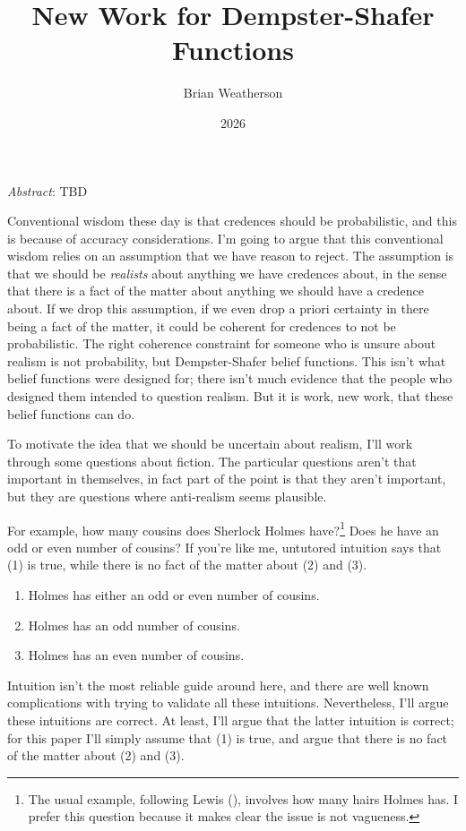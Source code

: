 \documentclass[
  11pt,
  letterpaper,
  DIV=11,
  numbers=noendperiod,
  twoside]{scrartcl}
\title{New Work for Dempster-Shafer Functions}
\author{Brian Weatherson}
\date{2026}
\providecommand{\tightlist}{%
  \setlength{\itemsep}{0pt}\setlength{\parskip}{0pt}}
\renewenvironment{abstract}
 {\vspace{-1.25cm}
 \quotation\small\noindent\emph{Abstract}:}
 {\endquotation}
\renewenvironment{abstract}
 {\quotation\small\noindent\emph{Abstract}:}
 {\endquotation\vspace{-0.02cm}}
\begin{document}
\maketitle
\begin{abstract}
TBD
\end{abstract}


Conventional wisdom these day is that credences should be probabilistic,
and this is because of accuracy considerations. I'm going to argue that
this conventional wisdom relies on an assumption that we have reason to
reject. The assumption is that we should be \emph{realists} about
anything we have credences about, in the sense that there is a fact of
the matter about anything we should have a credence about. If we drop
this assumption, if we even drop a priori certainty in there being a
fact of the matter, it could be coherent for credences to not be
probabilistic. The right coherence constraint for someone who is unsure
about realism is not probability, but Dempster-Shafer belief functions.
This isn't what belief functions were designed for; there isn't much
evidence that the people who designed them intended to question realism.
But it is work, new work, that these belief functions can do.

To motivate the idea that we should be uncertain about realism, I'll
work through some questions about fiction. The particular questions
aren't that important in themselves, in fact part of the point is that
they aren't important, but they are questions where anti-realism seems
plausible.

For example, how many cousins does Sherlock Holmes have?\footnote{The
  usual example, following Lewis (),
  involves how many hairs Holmes has. I prefer this question because it
  makes clear the issue is not vagueness.} Does he have an odd or even
number of cousins? If you're like me, untutored intuition says that (1)
is true, while there is no fact of the matter about (2) and (3).

\begin{enumerate}
\def\labelenumi{(\arabic{enumi})}
\tightlist
\item
  Holmes has either an odd or even number of cousins.
\item
  Holmes has an odd number of cousins.
\item
  Holmes has an even number of cousins.
\end{enumerate}

Intuition isn't the most reliable guide around here, and there are well
known complications with trying to validate all these intuitions.
Nevertheless, I'll argue these intuitions are correct. At least, I'll
argue that the latter intuition is correct; for this paper I'll simply
assume that (1) is true, and argue that there is no fact of the matter
about (2) and (3).
\end{document}
